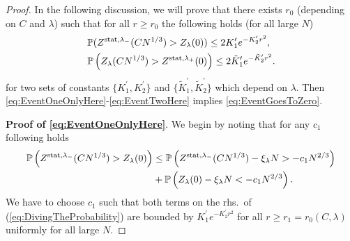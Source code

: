\documentclass[12pt,a4paper]{article}
\numberwithin{equation}{section}
\newcommand{\Pb}{\mathbb{P}}
\begin{document}
\begin{proof} In the following discussion, we will prove that there exists $r_0$ (depending on $C$ and $\lambda$) such that for all $r\geq r_0$ the following holds (for all large $N$)
\begin{align}
 &\Pb(Z^{{\rm stat},\lambda_{-}}(CN^{1/3}) >Z_{\lambda}(0))\leq 2 K^{\prime}_1e^{-K^{\prime}_2 r^2},\label{eq:EventOneOnlyHere}\\
 &\Pb\left( Z_\lambda(CN^{1/3})> Z^{{\rm stat},\lambda_+}(0)\right)\leq 2 \tilde{K}^{\prime}_1e^{-\tilde{K}^{\prime}_2 r^2}\label{eq:EventTwoHere}.
\end{align}
for two sets of constants $\{K^{\prime}_1,K^{\prime}_2\}$ and $\{\tilde{K}^{\prime}_1,\tilde{K}^{\prime}_2\}$ which depend on $\lambda$. Then \eqref{eq:EventOneOnlyHere}-\eqref{eq:EventTwoHere} implies \eqref{eq:EventGoesToZero}.

\textbf{Proof of \eqref{eq:EventOneOnlyHere}}.
We begin by noting that for any $c_1$ following holds
\begin{equation}\label{eq:DivingTheProbability}
\begin{aligned}
\Pb\left(Z^{{\rm stat},\lambda_-}(CN^{1/3})> Z_\lambda(0)\right) &\leq \Pb\left(Z^{{\rm stat},\lambda_-}(CN^{1/3})-\xi_\lambda N>-c_1N^{2/3}\right)\\
&+ \Pb\left(Z_\lambda(0)-\xi_\lambda N<-c_1N^{2/3}\right).
\end{aligned}
\end{equation}
We have to choose $c_1$ such that both terms on the rhs.\ of (\ref{eq:DivingTheProbability}) are bounded by $K^{\prime}_1 e^{-K^{\prime}_2 r^2}$ for all $r\geq r_1=r_0(C,\lambda)$ uniformly for all large $N$.


\end{proof}
\end{document}
